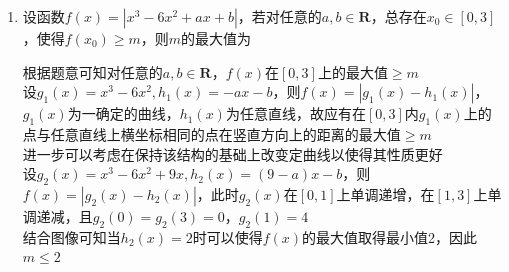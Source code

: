 \begin{enumerate}
\begin{enumerate}
        \item 设函数$f(x) = |x^3 - 6x^2+ax+b|$，若对任意的$a, b \in \mathbf{R}$，总存在$x_0 \in [0, 3]$，使得$f(x_0) \geq m$，则$m$的最大值为
        \begin{jieda}
            根据题意可知对任意的$a, b \in \mathbf{R}$，$f(x)$在$[0, 3]$上的最大值$\geq m$ \\
            设$g_1(x) = x^3-6x^2, h_1(x) = -ax-b$，则$f(x) = |g_1(x) - h_1(x)|$，$g_1(x)$为一确定的曲线，$h_1(x)$为任意直线，故应有在$[0, 3]$内$g_1(x)$上的点与任意直线上横坐标相同的点在竖直方向上的距离的最大值$\geq m$ \\
            进一步可以考虑在保持该结构的基础上改变定曲线以使得其性质更好 \\
            设$g_2(x) = x^3-6x^2+9x, h_2(x) = (9-a)x-b$，则$f(x) = |g_2(x) - h_2(x)|$，此时$g_2(x)$在$[0, 1]$上单调递增，在$[1, 3]$上单调递减，且$g_2(0) = g_2(3) = 0$，$g_2(1) = 4$ \\
            结合图像可知当$h_2(x) = 2$时可以使得$f(x)$的最大值取得最小值2，因此$m \leq 2$
        \end{jieda}
    \end{enumerate}
\end{enumerate}